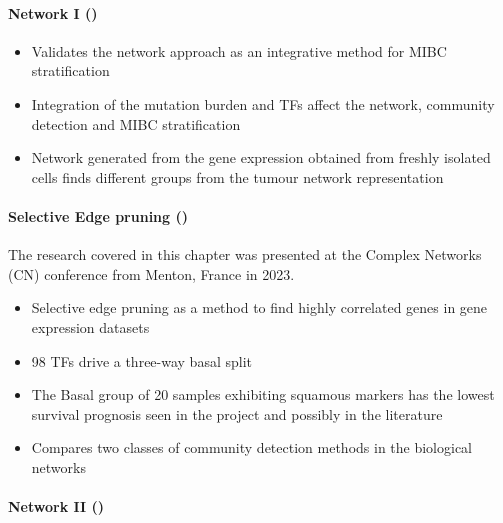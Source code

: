 \paragraph*{Network I ()}

\begin{itemize}
    \item Validates the network approach as an integrative method for MIBC stratification
     \item Integration of the mutation burden and TFs affect the network, community detection and MIBC stratification
     \item Network generated from the gene expression obtained from freshly isolated cells finds different groups from the tumour network representation
\end{itemize}

\paragraph*{Selective Edge pruning ()}

The research covered in this chapter was presented at the Complex Networks (CN) conference from Menton, France in 2023.

\begin{itemize}
    \item Selective edge pruning as a method to find highly correlated genes in gene expression datasets 
    \item 98 TFs drive a three-way basal split
    \item The Basal group of 20 samples exhibiting squamous markers has the lowest survival prognosis seen in the project and possibly in the literature
    \item Compares two classes of community detection methods in the biological networks
\end{itemize}

\paragraph*{Network II ()}

